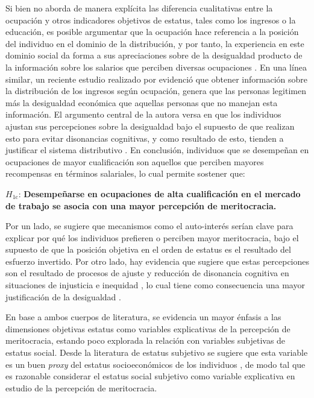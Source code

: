 \documentclass[12pt]{article}
\begin{document}
Si bien \citet{Svallfors2006} no aborda de manera explícita las diferencia cualitativas entre la ocupación y otros indicadores objetivos de estatus, tales como los ingresos o la educación, es posible argumentar que la ocupación hace referencia a la posición del individuo en el dominio de la distribución, y por tanto, la experiencia en este dominio social da forma a sus apreciaciones sobre de la desigualdad producto de la información sobre los salarios que perciben diversas ocupaciones \cite{rehm09}. En una línea similar, un reciente estudio realizado por \citet{Trump2017} evidenció que obtener información sobre la distribución de los ingresos según ocupación, genera que las personas legitimen más la desigualdad económica que aquellas personas que no manejan esta información. El argumento central de la autora versa en que los individuos ajustan sus percepciones sobre la desigualdad bajo el supuesto de que realizan esto para evitar disonancias cognitivas, y como resultado de esto, tienden a justificar el sistema distributivo \cite{Trump2017}. En conclusión, individuos que se desempeñan en ocupaciones de mayor cualificación son aquellos que perciben mayores recompensas en términos salariales, lo cual permite sostener que:  

$H_{\text{1c}}$: \textbf{Desempeñarse en ocupaciones de alta cualificación en el mercado de trabajo se asocia con una mayor percepción de meritocracia.}

Por un lado, se sugiere que mecanismos como el auto-interés serían clave para explicar por qué los individuos prefieren o perciben mayor meritocracia, bajo el supuesto de que la posición objetiva en el orden de estatus es el resultado del esfuerzo invertido. Por otro lado, hay evidencia que sugiere que estas percepciones son el resultado de procesos de ajuste y reducción de disonancia cognitiva en situaciones de injusticia e inequidad \citep{Adams1965}, lo cual tiene como consecuencia una mayor justificación de la desigualdad \citep{Trump2017,McCoy2007}. 

En base a ambos cuerpos de literatura, se evidencia un mayor énfasis a las dimensiones objetivas estatus como variables explicativas de la percepción de meritocracia, estando poco explorada la relación con variables subjetivas de estatus social. Desde la literatura de estatus subjetivo se sugiere que esta variable es un buen \textit{proxy} del estatus socioeconómicos de los individuos \citep{Castillo2013,Andersson2018a}, de modo tal que es razonable considerar el estatus social subjetivo como variable explicativa en estudio de la percepción de meritocracia.      
\end{document}
